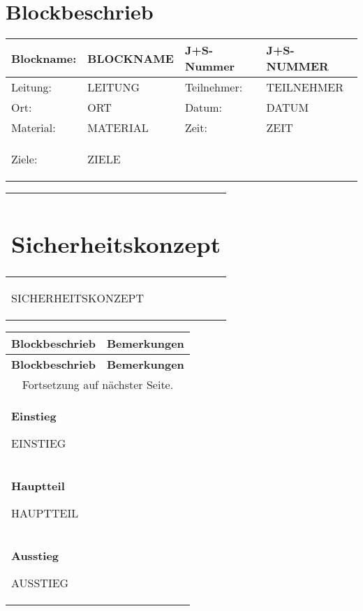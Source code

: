\documentclass[12pt]{article}
\newcommand{\tstamp}{DATUM}
\begin{document}
\section*{Blockbeschrieb}
	\begin{tabular}{|p{2.5cm}|p{5.5cm}|p{2.5cm}|p{5.5cm}|}
	\hline
	Blockname: 	& BLOCKNAME	& J+S-Nummer	& J+S-NUMMER \\ \hline
	Leitung:		& LEITUNG		& Teilnehmer:	& TEILNEHMER \\ \hline
	Ort:			& ORT			& Datum:		& \tstamp \\ \hline
	Material:		& MATERIAL		& Zeit:		& ZEIT \\ \hline
	Ziele:		&  \multicolumn{3}{p{13.5cm+4\tabcolsep+2\arrayrulewidth}|}{\begin{compactitem} %
		ZIELE %
 	\end{compactitem}} \\
	\hline
\end{tabular}



\begin{tabular}{|p{17.5cm+3\arrayrulewidth}|}
	\hline
	\parbox[0pt][1.5cm][c]{0cm}{\section*{Sicherheitskonzept}}\\
	\hline
	\begin{compactitem}
		 SICHERHEITSKONZEPT
 	\end{compactitem}\\
 	\hline 
\end{tabular}

\begin{longtable}{|p{12cm}|p{5cm+2\arrayrulewidth}|}
	\hline 
	\bf Blockbeschrieb & \bf Bemerkungen \\ \hline 
	\endfirsthead \hline \bf Blockbeschrieb & \bf Bemerkungen \\ \hline 
	\endhead \hline 
	\multicolumn{2}{|c|}{Fortsetzung auf nächster Seite.} \\ \hline 
	\endfoot
	\endlastfoot 
	{\large\bf {Einstieg}}
	
	EINSTIEG & \\ \hline
	{\large\bf {Hauptteil}}
	
	HAUPTTEIL & \\ \hline
	{\large\bf {Ausstieg}}
	
	AUSSTIEG & \\ \hline

	\end{longtable}
\end{document}
